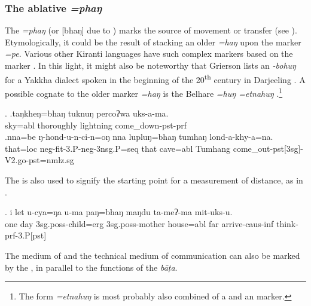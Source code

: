 \subsubsection{The ablative  \emph{=phaŋ}}\label{case-abl}	

The  \emph{=phaŋ} (or [bhaŋ] due to ) marks the source of movement or transfer (see \Next). Etymologically, it could be the result of stacking an older  \emph{=haŋ} upon the  marker \emph{=pe}. Various other Kiranti languages have such complex  markers based on the  marker \citep[81]{Ebert1994The-structure}. In this light, it might also be noteworthy that Grierson lists an  \emph{-bohuŋ}  for a Yakkha dialect spoken in the beginning of the 20\textsuperscript{th} century  in Darjeeling \citep{Grierson1909Linguistic}. A possible cognate to the older marker \emph{=haŋ} is the  Belhare  \emph{=huŋ \ti =etnahuŋ} \citep[549]{Bickel2003Belhare}.\footnote{The form \emph{=etnahuŋ} is most probably also combined of a  and an  marker.}

\ex. \ag.taŋkheŋ=bhaŋ   tuknuŋ    percoʔwa uks-a-ma.\\
sky{\sc =abl} thoroughly lightning come\_down{\sc [3sg]-pst-prf}\\
\bg.nna=be     ŋ-hond-u-n-ci-n=oŋ      nna  lupluŋ=bhaŋ   tumhaŋ lond-a-khy-a=na.\\
that{\sc =loc} {\sc neg-}fit{\sc -3.P-neg-3nsg.P=seq} that  cave{\sc =abl} Tumhang come\_out{\sc -pst[3sg]-V2.go-pst=nmlz.sg}\\


The  is also used to signify the starting point for a measurement of distance, as in \Next.

\exg. i   let u-cya=ŋa              u-ma              paŋ=bhaŋ    maŋdu ta-meʔ-ma             mit-uks-u.\\
one day {\sc 3sg.poss-}child{\sc =erg} {\sc 3sg.poss-}mother house{\sc =abl} far arrive{\sc -caus-inf} think{\sc -prf-3.P[pst]}\\

The medium of  and the technical medium of communication can also be marked by  the ,  in parallel to the functions of the   \emph{bāṭa}. 

